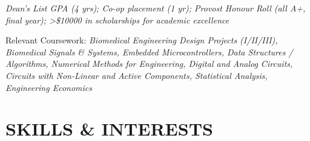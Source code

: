 \documentclass[a4paper,10pt]{article}
\begin{document}
\textit{Dean’s List GPA (4 yrs); Co-op placement (1 yr); Provost Honour Roll (all A+, final year); >\$10000 in scholarships for academic excellence}

Relevant Coursework: \textit{Biomedical Engineering Design Projects (I/II/III), Biomedical Signals \& Systems,
Embedded Microcontrollers, Data Structures / Algorithms, Numerical Methods for Engineering, Digital and Analog Circuits, Circuits with Non-Linear and Active Components, Statistical Analysis, Engineering Economics}


\section{SKILLS \& INTERESTS}
\end{document}
